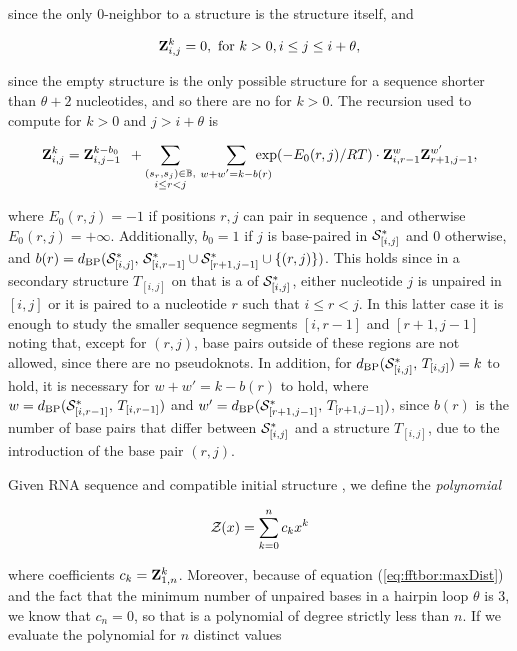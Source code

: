since the only $0$-neighbor to a structure \strSt
is the structure \strSt itself, and

\begin{align}
\label{eq:fftbor:initZpart2}
\bfZ{k}{i,j} = 0, \text{ for } k > 0, i \le j \leq i + \theta,
\end{align}

since the empty structure is the only possible structure for a
sequence shorter than $\theta + 2$ nucleotides, and so there are no
\kNbrs for $k>0$. The recursion used to compute
 for $k > 0$ and $j > i+\theta$ is

\begin{align}
\label{eq:fftbor:bfZkij}
\bfZ{k}{i,j} = \bfZ{k-b_0}{i,j-1}\enspace +
\sum_{\substack{(s_r,s_j) \in \bpSet, \\ i \leq r<j}}\qquad
\sum_{\mathclap{w+w'=k-b(r)}}\enspace
\exp(-E_0(r,j)/RT) \cdot \bfZ{w}{i,r-1} \bfZ{w'}{r+1,j-1},
\end{align}

where $E_0(r,j) = -1$ if positions $r,j$ can pair in sequence \seq,
and otherwise $E_0(r,j) = +\infty$. Additionally,
$b_0 = 1$ if $j$ is base-paired
in $\mathcal S^*_{[i,j]}$ and $0$ otherwise, and
$b(r)=d_{\text{BP}}(\mathcal S^*_{[i,j]},\,\mathcal S^*_{[i,r-1]} \cup \mathcal S^*_{[r+1,j-1]} \cup\{(r,j)\})$.
This holds since in a secondary
structure $T_{[i,j]}$ on \seqIJ that is a \kNbr of
$\mathcal S^*_{[i,j]}$,
either nucleotide $j$ is unpaired in $[i,j]$ or it is
paired to a nucleotide $r$ such that $i \leq r < j$. In this
latter case it is enough to study the smaller sequence segments
$[i,r-1]$ and $[r+1,j-1]$ noting that, except for $(r,j)$,
base pairs outside of these regions are not allowed, since there
are no pseudoknots. In addition,
for $d_{\text{BP}}(\mathcal S^*_{[i,j]},\,T_{[i,j]}) = k$ to hold,
it is necessary for $w+w' = k -b(r)$ to hold, where $w =
d_{\text{BP}}(\mathcal S^*_{[i,r-1]},\,T_{[i,r-1]})$ and $w' =
d_{\text{BP}}(\mathcal S^*_{[r+1,j-1]},\,T_{[r+1,j-1]})$, since $b(r)$ is the
number of base pairs that differ between $\mathcal S^*_{[i,j]}$ and a
structure $T_{[i,j]}$, due to the introduction of the base pair
$(r,j)$.

Given RNA sequence \seq and compatible initial structure \strSt,
we define the {\em polynomial}

\begin{align}
\label{eq:fftbor:zOfX}
\emZ{} = \sum_{k=0}^n c_k x^k
\end{align}

where coefficients $c_k={\bf Z}^{k}_{1,n}$. Moreover, because of equation
(\ref{eq:fftbor:maxDist}) and the fact that the minimum number of
unpaired bases in a hairpin loop $\theta$ is $3$, we know that $c_n=0$,
so that \emZ{} is a polynomial of degree strictly less than $n$.
If we evaluate the polynomial \emZ{} for $n$ distinct values


